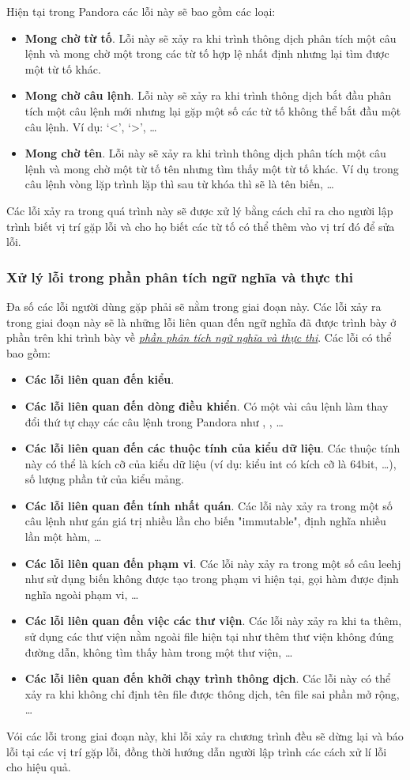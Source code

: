 Hiện tại trong Pandora các lỗi này sẽ bao gồm các loại:
\begin{itemize}
    \item \textbf{Mong chờ từ tố}. Lỗi này sẽ xảy ra khi trình thông dịch phân tích một câu lệnh và mong chờ một trong các từ tố hợp lệ nhất định nhưng lại tìm được một từ tố khác.
    \item \textbf{Mong chờ câu lệnh}. Lỗi này sẽ xảy ra khi trình thông dịch bắt đầu phân tích một câu lệnh mới nhưng lại gặp một số các từ tố không thể bắt đầu một câu lệnh. Ví dụ: `<', `>', \dots
    \item \textbf{Mong chờ tên}. Lỗi này sẽ xảy ra khi trình thông dịch phân tích một câu lệnh và mong chờ một từ tố tên nhưng tìm thấy một từ tố khác. Ví dụ trong câu lệnh vòng lặp trình lặp thì sau từ khóa  thì sẽ là tên biến, \dots
\end{itemize}

Các lỗi xảy ra trong quá trình này sẽ được xử lý bằng cách chỉ ra cho người lập trình biết vị trí gặp lỗi và cho họ biết các từ tố có thể thêm vào vị trí đó để sửa lỗi.

\subsubsection{Xử lý lỗi trong phần phân tích ngữ nghĩa và thực thi}
Đa số các lỗi người dùng gặp phải sẽ nằm trong giai đoạn này. Các lỗi xảy ra trong giai đoạn này sẽ là những lỗi liên quan đến ngữ nghĩa đã được trình bày ở phần trên khi trình bày về \hyperref[ch1:semantic]{\textit{phần phân tích ngữ nghĩa và thực thi}}. Các lỗi có thể bao gồm:

\begin{itemize}
    \item \textbf{Các lỗi liên quan đến kiểu}.
    \item \textbf{Các lỗi liên quan đến dòng điều khiển}. Có một vài câu lệnh làm thay đổi thứ tự chạy các câu lệnh trong Pandora như , , \dots
    \item \textbf{Các lỗi liên quan đến các thuộc tính của kiểu dữ liệu}. Các thuộc tính này có thể là kích cỡ của kiểu dữ liệu (ví dụ: kiểu int có kích cỡ là 64bit, \dots), số lượng phần tử của kiểu mảng.
    \item \textbf{Các lỗi liên quan đến tính nhất quán}. Các lỗi này xảy ra trong một số câu lệnh như gán giá trị nhiều lần cho biến "immutable", định nghĩa nhiều lần một hàm, \dots
    \item \textbf{Các lỗi liên quan đến phạm vi}. Các lỗi này xảy ra trong một số câu leehj như sử dụng biến không được tạo trong phạm vi hiện tại, gọi hàm được định nghĩa ngoài phạm vi, \dots
    \item \textbf{Các lỗi liên quan đến việc các thư viện}. Các lỗi này xảy ra khi ta thêm, sử dụng các thư viện nằm ngoài file hiện tại như thêm thư viện không đúng đường dẫn, không tìm thấy hàm trong một thư viện, \dots
    \item \textbf{Các lỗi liên quan đến khởi chạy trình thông dịch}. Các lỗi này có thể xảy ra khi không chỉ định tên file được thông dịch, tên file sai phần mở rộng, \dots
\end{itemize}

Vói các lỗi trong giai đoạn này, khi lỗi xảy ra chương trình đều sẽ dừng lại và báo lỗi tại các vị trí gặp lỗi, đồng thời hướng dẫn người lập trình các cách xử lí lỗi cho hiệu quả.
